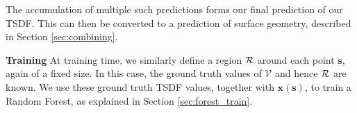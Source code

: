 \documentclass[10pt,twocolumn,letterpaper]{article}
\newcommand{\pixelidx}{\mathbf{s}}
\newcommand{\voxelgrid}{\mathcal{V}}
\newcommand{\note}[1]{\textcolor{blue}{NOTE: #1}}
\renewcommand{\paragraph}{\vspace{2pt}\noindent\textbf}
\begin{document}
The accumulation of multiple such predictions forms our final prediction of our TSDF.
This can then be converted to a prediction of surface geometry, described in Section \ref{sec:combining}.



\paragraph{Training}
At training time, we similarly define a region $\mathcal{R}$ around each point $\pixelidx$, again of a fixed size. 
In this case, the ground truth values of $\voxelgrid$ and hence $\mathcal{R}$ are known. 
We use these ground truth TSDF values, together with $\mathbf{x}(\pixelidx)$, to train a Random Forest, as explained in  Section \ref{sec:forest_train}.
\end{document}
